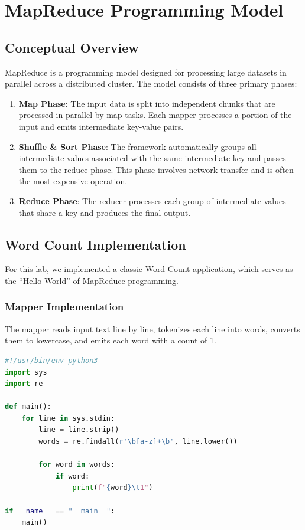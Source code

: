 \documentclass[11pt,a4paper]{article}
\begin{document}
\section{MapReduce Programming Model}

\subsection{Conceptual Overview}

MapReduce is a programming model designed for processing large datasets in parallel across a distributed cluster. The model consists of three primary phases:

\begin{enumerate}
    \item \textbf{Map Phase}: The input data is split into independent chunks that are processed in parallel by map tasks. Each mapper processes a portion of the input and emits intermediate key-value pairs.
    
    \item \textbf{Shuffle \& Sort Phase}: The framework automatically groups all intermediate values associated with the same intermediate key and passes them to the reduce phase. This phase involves network transfer and is often the most expensive operation.
    
    \item \textbf{Reduce Phase}: The reducer processes each group of intermediate values that share a key and produces the final output.
\end{enumerate}

\subsection{Word Count Implementation}

For this lab, we implemented a classic Word Count application, which serves as the ``Hello World'' of MapReduce programming.

\subsubsection{Mapper Implementation}

The mapper reads input text line by line, tokenizes each line into words, converts them to lowercase, and emits each word with a count of 1.

\begin{lstlisting}[language=Python, caption=Mapper Code (mapper.py)]
#!/usr/bin/env python3
import sys
import re

def main():
    for line in sys.stdin:
        line = line.strip()
        words = re.findall(r'\b[a-z]+\b', line.lower())
        
        for word in words:
            if word:
                print(f"{word}\t1")

if __name__ == "__main__":
    main()
\end{lstlisting}
\end{document}
